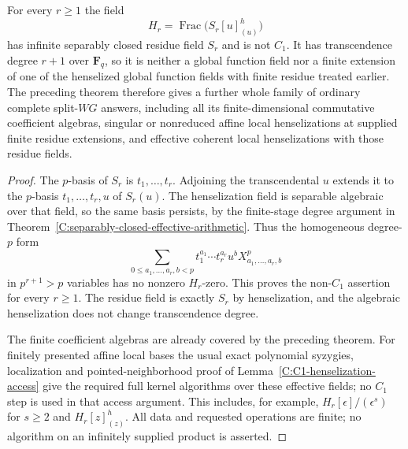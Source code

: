 \begin{corollary}
\label{C:infinite-residue-new-families}
For every $r\ge1$ the field
\[
 H_r=\operatorname{Frac}
          \bigl(S_r[u]_{(u)}^h\bigr)                    \tag{C.3.IR11}
\]
has infinite separably closed residue
field $S_r$ and is not $C_1$.
It has transcendence degree $r+1$
over $\mathbf F_q$, so it is neither
a global function field nor a finite
extension of one of the henselized
global function fields with finite
residue treated earlier.
The preceding theorem therefore
gives a further whole family of
ordinary complete split-$WG$ answers,
including all its finite-dimensional
commutative coefficient algebras,
singular or nonreduced affine local
henselizations at supplied finite
residue extensions, and effective
coherent local henselizations with
those residue fields.
\end{corollary}
\begin{proof}
The $p$-basis of $S_r$ is
$t_1,\ldots,t_r$.
Adjoining the transcendental $u$
extends it to the $p$-basis
$t_1,\ldots,t_r,u$ of $S_r(u)$.
The henselization field is
separable algebraic over that
field, so the same basis
persists, by the finite-stage
degree argument in
Theorem~\ref{C:separably-closed-effective-arithmetic}.
Thus the homogeneous degree-$p$
form
\[
 \sum_{0\le a_1,\ldots,a_r,b<p}
            t_1^{a_1}\cdots t_r^{a_r}u^b
                      X_{a_1,\ldots,a_r,b}^p           \tag{C.3.IR12}
\]
in $p^{r+1}>p$ variables has
no nonzero $H_r$-zero.
This proves the non-$C_1$
assertion for every $r\ge1$.
The residue field is exactly
$S_r$ by henselization, and
the algebraic henselization
does not change transcendence
degree.

The finite coefficient algebras
are already covered by the
preceding theorem.
For finitely presented affine
local bases the usual exact
polynomial syzygies, localization
and pointed-neighborhood proof
of Lemma~\ref{C:C1-henselization-access}
give the required full kernel
algorithms over these effective
fields; no $C_1$ step is used
in that access argument.
This includes, for example,
$H_r[\epsilon]/(\epsilon^s)$
for $s\ge2$ and
$H_r[z]_{(z)}^h$.
All data and requested operations
are finite; no algorithm on
an infinitely supplied product
is asserted.
\end{proof}
